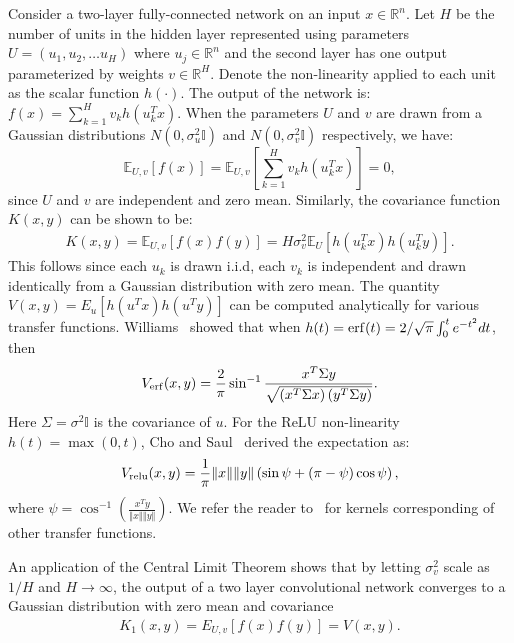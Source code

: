 Consider a two-layer fully-connected network on an input $x \in \mathbb{R}^n$. 
Let $H$ be the number of units in the hidden layer
represented using parameters $U = (u_1, u_2, \ldots u_H)$ where $u_j \in \mathbb{R}^n$
and the second layer has one output parameterized by weights $v \in
\mathbb{R}^H$. Denote the non-linearity applied to each unit as the
scalar function $h(\cdot)$. The output of the network is:  $f(x) = \sum_{k=1}^{H} v_k h(u_k^Tx).$
When the parameters $U$ and $v$ are
drawn from a Gaussian distributions $N(0, \sigma_u^2\mathbb{I})$ and
$N(0, \sigma_v^2\mathbb{I})$ respectively, we have:
\begin{equation*}
\mathbb{E}_{U,v}[f(x)] = \mathbb{E}_{U,v} \left[ \sum_{k=1}^{H} v_k
  h\left(u_k^Tx\right)\right] = 0, 
\end{equation*}
since $U$ and $v$ are independent and zero mean. 
Similarly, the covariance function $K(x,y)$ can be shown to be:
\begin{align*}
K(x,y) = \mathbb{E}_{U,v}[f(x)f(y)] = H\sigma_v^2 \mathbb{E}_{U} \left[ h\left(u_k^Tx\right)
  h\left(u_k^Ty\right) \right].
\end{align*}
This follows since each $u_k$ is drawn i.i.d, each
$v_k$ is independent and drawn identically from a Gaussian
distribution with zero mean.
The quantity $V(x, y)=E_u \left[ h(u^Tx)h(u^Ty)\right]$ can be
computed analytically for various transfer functions. 
Williams~\cite{williams1997computing} showed that when $h(t) = {\rm erf}(t) =
2/\sqrt{\pi}\int_{0}^{t}e^{-t^2}dt$, then 
\begin{align}
V_{{\rm erf}}(x, y) = \frac{2}{\pi}\sin^{-1} \frac{x^T\Sigma
  y}{\sqrt{\left(x^T\Sigma x \right)\left(y^T\Sigma y\right)}}. 
\end{align}
Here $\Sigma=\sigma^2 \mathbb{I}$ is the covariance of $u$.
For the ReLU non-linearity $h(t) = \max(0,t)$, Cho and Saul~\cite{cho2009kernel}
derived the expectation as:
\begin{align}
V_{\rm relu}(x, y) = \frac{1}{\pi}\Vert x \Vert \Vert y \Vert
\left(\sin \psi + (\pi -\psi)\cos \psi \right), 
\end{align}
where $\psi = \cos^{-1}\left(\frac{x^Ty}{\Vert x \Vert  \Vert y
  \Vert}\right)$. We refer the reader to~\cite{williams1997computing,cho2009kernel} for kernels
corresponding of other transfer functions.

An application of the Central Limit Theorem shows that by letting $\sigma_v^2$ scale as $1/H$ and $H \rightarrow \infty$,
the output of a two layer convolutional network converges to a
Gaussian distribution with zero mean and covariance 
\begin{align}
  K_1(x, y) = E_{U,v} \left[ f(x)f(y)\right] = V\left(x,y\right).
\end{align}

